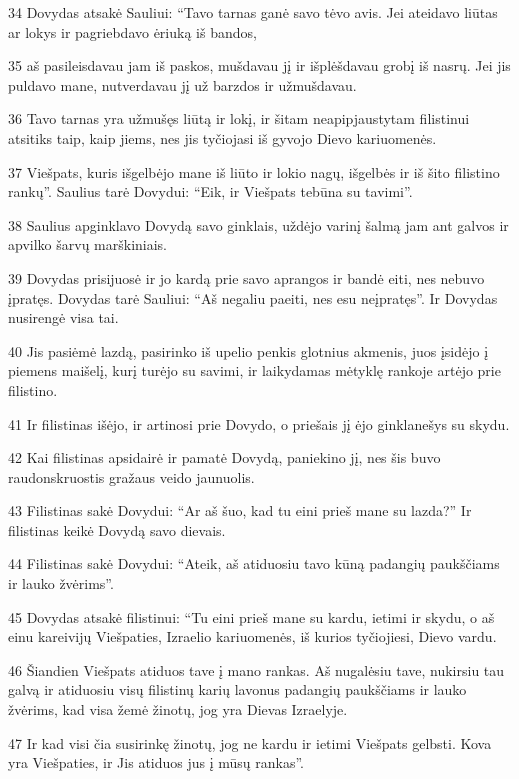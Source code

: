 \par 34 Dovydas atsakė Sauliui: “Tavo tarnas ganė savo tėvo avis. Jei ateidavo liūtas ar lokys ir pagriebdavo ėriuką iš bandos, 
\par 35 aš pasileisdavau jam iš paskos, mušdavau jį ir išplėšdavau grobį iš nasrų. Jei jis puldavo mane, nutverdavau jį už barzdos ir užmušdavau. 
\par 36 Tavo tarnas yra užmušęs liūtą ir lokį, ir šitam neapipjaustytam filistinui atsitiks taip, kaip jiems, nes jis tyčiojasi iš gyvojo Dievo kariuomenės. 
\par 37 Viešpats, kuris išgelbėjo mane iš liūto ir lokio nagų, išgelbės ir iš šito filistino rankų”. Saulius tarė Dovydui: “Eik, ir Viešpats tebūna su tavimi”. 
\par 38 Saulius apginklavo Dovydą savo ginklais, uždėjo varinį šalmą jam ant galvos ir apvilko šarvų marškiniais. 
\par 39 Dovydas prisijuosė ir jo kardą prie savo aprangos ir bandė eiti, nes nebuvo įpratęs. Dovydas tarė Sauliui: “Aš negaliu paeiti, nes esu neįpratęs”. Ir Dovydas nusirengė visa tai. 
\par 40 Jis pasiėmė lazdą, pasirinko iš upelio penkis glotnius akmenis, juos įsidėjo į piemens maišelį, kurį turėjo su savimi, ir laikydamas mėtyklę rankoje artėjo prie filistino. 
\par 41 Ir filistinas išėjo, ir artinosi prie Dovydo, o priešais jį ėjo ginklanešys su skydu. 
\par 42 Kai filistinas apsidairė ir pamatė Dovydą, paniekino jį, nes šis buvo raudonskruostis gražaus veido jaunuolis. 
\par 43 Filistinas sakė Dovydui: “Ar aš šuo, kad tu eini prieš mane su lazda?” Ir filistinas keikė Dovydą savo dievais. 
\par 44 Filistinas sakė Dovydui: “Ateik, aš atiduosiu tavo kūną padangių paukščiams ir lauko žvėrims”. 
\par 45 Dovydas atsakė filistinui: “Tu eini prieš mane su kardu, ietimi ir skydu, o aš einu kareivijų Viešpaties, Izraelio kariuomenės, iš kurios tyčiojiesi, Dievo vardu. 
\par 46 Šiandien Viešpats atiduos tave į mano rankas. Aš nugalėsiu tave, nukirsiu tau galvą ir atiduosiu visų filistinų karių lavonus padangių paukščiams ir lauko žvėrims, kad visa žemė žinotų, jog yra Dievas Izraelyje. 
\par 47 Ir kad visi čia susirinkę žinotų, jog ne kardu ir ietimi Viešpats gelbsti. Kova yra Viešpaties, ir Jis atiduos jus į mūsų rankas”. 

